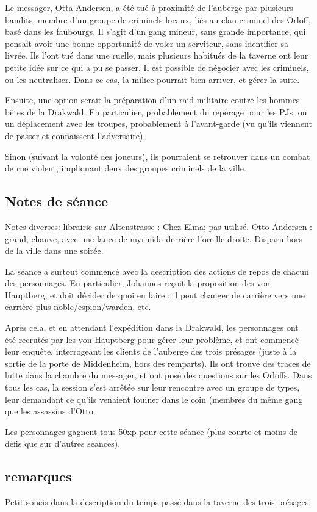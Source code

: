 \documentclass[10pt,a4paper]{book}
\begin{document}
Le messager, Otta Andersen, a été tué à proximité de l'auberge par plusieurs bandits, membre d'un groupe de criminels locaux, liés au clan criminel des Orloff, basé dans les faubourgs. Il s'agit d'un gang mineur, sans grande importance, qui pensait avoir une bonne opportunité de voler un serviteur, sans identifier sa livrée. Ils l'ont tué dans une ruelle, mais plusieurs habitués de la taverne ont leur petite idée sur ce qui a pu se passer. Il est possible de négocier avec les criminels, ou les neutraliser. Dans ce cas, la milice pourrait bien arriver, et gérer la suite.

Ensuite, une option serait la préparation d'un raid militaire contre les hommes-bêtes de la Drakwald. En particulier, probablement du repérage pour les PJs, ou un déplacement avec les troupes, probablement à l'avant-garde (vu qu'ils viennent de passer et connaissent l'adversaire).

Sinon (suivant la volonté des joueurs), ils pourraient se retrouver dans un combat de rue violent, impliquant deux des groupes criminels de la ville.
\subsection{Notes de séance}
Notes diverses: librairie sur Altenstrasse : Chez Elma; pas utilisé. Otto Andersen : grand, chauve, avec une lance de myrmida derrière l'oreille droite. Disparu hors de la ville dans une soirée.

La séance a surtout commencé avec la description des actions de repos de chacun des personnages. En particulier, Johannes reçoit la proposition des von Hauptberg, et doit décider de quoi en faire : il peut changer de carrière vers une carrière plus noble/espion/warden, etc. 

Après cela, et en attendant l'expédition dans la Drakwald, les personnages ont été recrutés par les von Hauptberg pour gérer leur problème, et ont commencé leur enquête, interrogeant les clients de l'auberge des trois présages (juste à la sortie de la porte de Middenheim, hors des remparts). Ils ont trouvé des traces de lutte dans la chambre du messager, et ont posé des questions sur les Orloffs. Dans tous les cas, la session s'est arrêtée sur leur rencontre avec un groupe de types, leur demandant ce qu'ils venaient fouiner dans le coin (membres du même gang que les assassins d'Otto.

Les personnages gagnent tous 50xp pour cette séance (plus courte et moins de défis que sur d'autres séances).
\subsection{remarques}
Petit soucis dans la description du temps passé dans la taverne des trois présages.
\end{document}
